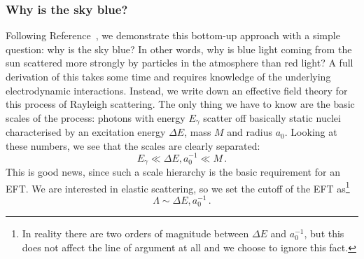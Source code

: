 




\subsubsection{Why is the sky blue?}

Following Reference~\cite{Kaplan:2005es}, we demonstrate this
bottom-up approach with a simple question: why is the sky blue?
In other words, why is blue light coming from the sun scattered more
strongly by particles in the atmosphere than red light?  A full
derivation of this takes some time and requires knowledge of the
underlying electrodynamic interactions. Instead, we write down an
effective field theory for this process of Rayleigh scattering. The
only thing we have to know are the basic scales of the process:
photons with energy $E_\gamma$ scatter off basically static nuclei
characterised by an excitation energy $\Delta E$, mass $M$ and radius
$a_0$. Looking at these numbers, we see that the scales are clearly
separated:
%
\begin{equation}
  E_\gamma \ll \Delta E,  a_0^{-1} \ll M \,.
\end{equation}
%
This is good news, since such a scale hierarchy is the basic
requirement for an EFT. We are interested in elastic scattering, so we
set the cutoff of the EFT as\footnote{In reality there are two orders
  of magnitude between $\Delta E$ and $a_0^{-1}$, but this does not
  affect the line of argument at all and we choose to ignore this
  fact.}
\begin{equation}
  \Lambda \sim \Delta E, a_0^{-1} \,.
\end{equation}

